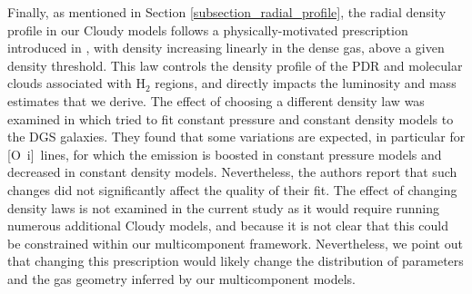 \documentclass{aa}
\newcommand{\hii}{H~{\sc ii}}
\newcommand{\oi}{[O~{\sc i}]}
\begin{document}
Finally, as mentioned in Section \ref{subsection_radial_profile}, the radial density profile in our Cloudy models follows a physically-motivated prescription introduced in \cite{cormier_herschel_2019}, with density increasing linearly in the dense gas, above a given density threshold. This law controls the density profile of the PDR and molecular clouds associated with H$_2$ regions, and directly impacts the luminosity and mass estimates that we derive. The effect of choosing a different density law was examined in \cite{cormier_herschel_2019} which tried to fit constant pressure and constant density models to the DGS galaxies. They found that some variations are expected, in particular for \oi\ lines, for which the emission is boosted in constant pressure models and decreased in constant density models. Nevertheless, the authors report that such changes did not significantly affect the quality of their fit. The effect of changing density laws is not examined in the current study as it would require running numerous additional Cloudy models, and because it is not clear that this could be constrained within our multicomponent framework. Nevertheless, we point out that changing this prescription would likely change the distribution of parameters and the gas geometry inferred by our multicomponent models.

    
    
    
    
\end{document}
